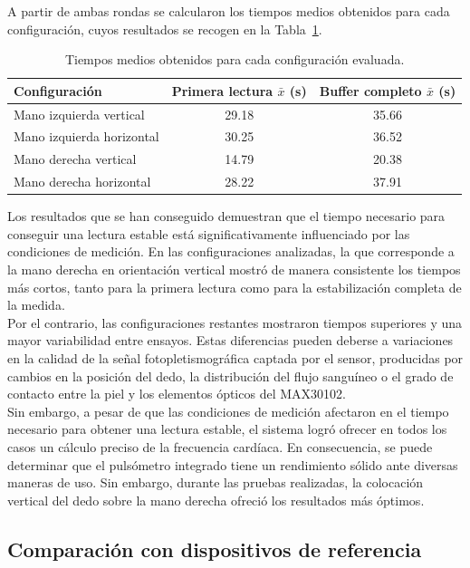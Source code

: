 A partir de ambas rondas se calcularon los tiempos medios obtenidos para cada configuración, cuyos resultados se recogen en la Tabla~\ref{tab:condiciones_medida}.

\begin{table}[H]
\centering
\caption{Tiempos medios obtenidos para cada configuración evaluada.}
\label{tab:condiciones_medida}
\begin{tabular}{|l|c|c|}
\hline
\textbf{Configuración} & \textbf{Primera lectura $\bar{x}$ (s)} & \textbf{Buffer completo $\bar{x}$ (s)} \\ \hline
Mano izquierda vertical & 29.18 & 35.66 \\ \hline
Mano izquierda horizontal & 30.25 & 36.52 \\ \hline
Mano derecha vertical & 14.79 & 20.38 \\ \hline
Mano derecha horizontal & 28.22 & 37.91 \\ \hline
\end{tabular}
\end{table}

Los resultados que se han conseguido demuestran que el tiempo necesario para conseguir una lectura estable está significativamente influenciado por las condiciones de medición. En las configuraciones analizadas, la que corresponde a la mano derecha en orientación vertical mostró de manera consistente los tiempos más cortos, tanto para la primera lectura como para la estabilización completa de la medida.\\

Por el contrario, las configuraciones restantes mostraron tiempos superiores y una mayor variabilidad entre ensayos. Estas diferencias pueden deberse a variaciones en la calidad de la señal fotopletismográfica captada por el sensor, producidas por cambios en la posición del dedo, la distribución del flujo sanguíneo o el grado de contacto entre la piel y los elementos ópticos del MAX30102.\\

Sin embargo, a pesar de que las condiciones de medición afectaron en el tiempo necesario para obtener una lectura estable, el sistema logró ofrecer en todos los casos un cálculo preciso de la frecuencia cardíaca. En consecuencia, se puede determinar que el pulsómetro integrado tiene un rendimiento sólido ante diversas maneras de uso. Sin embargo, durante las pruebas realizadas, la colocación vertical del dedo sobre la mano derecha ofreció los resultados más óptimos.


\subsection{Comparación con dispositivos de referencia}

